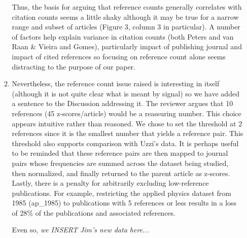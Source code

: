 \documentclass[11pt, oneside]{article}   	%
\begin{document}
\begin{itemize}
\begin{enumerate}
Thus, the basis for arguing that reference counts generally correlates with citation counts seems a little shaky although it may be true for a narrow range and subset of articles (Figure 3, column 3 in particular). A number of factors help explain variance in citation counts (both Peters and van Raan \& Vieira and Gomes), particularly impact of publishing journal and impact of cited references so focusing on reference count alone seems distracting to the purpose of our paper. 

\item Nevertheless, the reference count issue raised is interesting in itself (although it is not quite clear what is meant by signal) so we have added a sentence to the Discussion addressing it. The reviewer argues that 10 references (45 z-scores/article) would be a reassuring number. This choice appears intuitive rather than reasoned. We chose to set the threshold at 2 references since it is the smallest number that yields a reference pair. This threshold also supports comparison with Uzzi's data. It is perhaps useful to be reminded that these reference pairs are then mapped to journal pairs whose frequencies are summed across the dataset being studied, then normalized, and finally returned to the parent article as z-scores. Lastly, there is a penalty for arbitrarily excluding low-reference publications. For example, restricting the applied physics dataset from 1985 (ap\_1985) to publications with 5 references or less results in a loss of 28\% of the publications and associated references. 

\vspace{3mm} Even so, \emph{we INSERT Jim's new data here... }


\end{enumerate}
\end{itemize}
\end{document}
